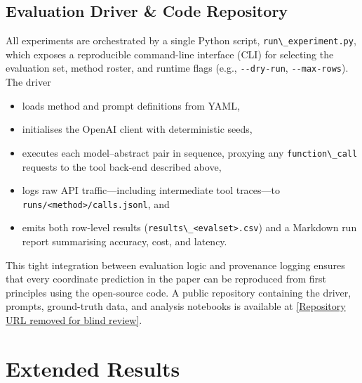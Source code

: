 \subsection{Evaluation Driver \& Code
Repository}\label{a.5-evaluation-driver-code-repository}

All experiments are orchestrated by a single Python script,
\passthrough{\lstinline!run\_experiment.py!}, which exposes a
reproducible command-line interface (CLI) for selecting the evaluation
set, method roster, and runtime flags (e.g.,
\passthrough{\lstinline!--dry-run!},
\passthrough{\lstinline!--max-rows!}). The driver

\begin{itemize}
\tightlist
\item
  loads method and prompt definitions from YAML,
\item
  initialises the OpenAI client with deterministic seeds,
\item
  executes each model--abstract pair in sequence, proxying any
  \passthrough{\lstinline!function\_call!} requests to the tool back-end
  described above,
\item
  logs raw API traffic---including intermediate tool traces---to
  \passthrough{\lstinline!runs/<method>/calls.jsonl!}, and
\item
  emits both row-level results
  (\passthrough{\lstinline!results\_<evalset>.csv!}) and a Markdown run
  report summarising accuracy, cost, and latency.
\end{itemize}

This tight integration between evaluation logic and provenance logging
ensures that every coordinate prediction in the paper can be reproduced
from first principles using the open-source code. A public repository
containing the driver, prompts, ground-truth data, and analysis
notebooks is available at
\url{[Repository URL removed for blind review]}.

\section{Extended
Results}\label{appendix-b-extended-results}

\DIFdelbegin \subsection{}%
\addtocounter{subsection}{-1}%

